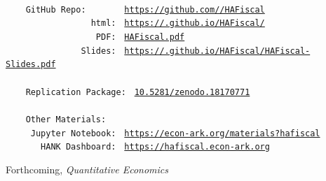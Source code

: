 \documentclass{econsocart}
\begin{document}
\providecommand{\REMARK}{\href{https://github.com/econ-ark/REMARK}{REMARK}}
\begin{footnotesize}
  \setlength{\parskip}{0pt}
  \parbox{0.9\textwidth}{
    \begin{tabbing}
      \texttt{~~~~~~~~~~~~~~~~~~~~~~~} \= \=  \\
      \texttt{~~~~GitHub~Repo:~~~~~~~} \> \> \texttt{\href{https://github.com/\owner/HAFiscal}{https://github.com/\owner/HAFiscal}} \\
      \texttt{~~~~~~~~~~~~~~~~~html:~} \> \> \texttt{\href{https://\owner.github.io/HAFiscal/}{https://\owner.github.io/HAFiscal/}} \\
      \texttt{~~~~~~~~~~~~~~~~~~PDF:~} \> \> \texttt{\href{https://github.com/\owner/HAFiscal/blob/master/HAFiscal.pdf}{HAFiscal.pdf}} \\
      \texttt{~~~~~~~~~~~~~~~Slides:~} \> \> \texttt{\href{https://\owner.github.io/HAFiscal/HAFiscal-Slides.pdf}{https://\owner.github.io/HAFiscal/HAFiscal-Slides.pdf}} \\
      \texttt{~~~~~~~~~~~~~~~~~~~~~~~} \> \>  \\
      \texttt{~~~~Replication~Package:~} \> \> \texttt{\href{https://doi.org/10.5281/zenodo.18170771}{10.5281/zenodo.18170771}} \\
      \texttt{~~~~~~~~~~~~~~~~~~~~~~~} \> \>  \\
      \texttt{~~~~Other~Materials:~~~} \> \> \\
      \texttt{~~~~~Jupyter~Notebook:~} \> \> \texttt{\href{https://econ-ark.org/materials?hafiscal}{https://econ-ark.org/materials?hafiscal}} \\
      \texttt{~~~~~~~HANK~Dashboard:~} \> \> \texttt{\href{https://hafiscal.econ-ark.org}{https://hafiscal.econ-ark.org}} \\
    \end{tabbing}
  } %
\end{footnotesize}
\vspace{-0.3\baselineskip}

\centerline{Forthcoming, \textit{Quantitative Economics}}
\vspace{-0.3\baselineskip}
\end{document}

